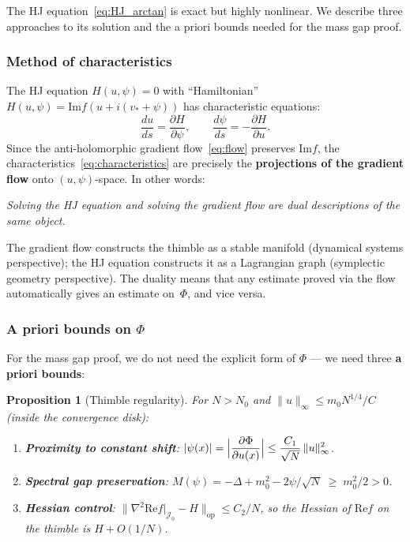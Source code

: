 \documentclass[12pt]{article}
\newtheorem{proposition}[theorem]{Proposition}
\theoremstyle{definition}
\theoremstyle{remark}
\newcommand{\im}{\mathrm{Im}}
\newcommand{\re}{\mathrm{Re}}
\begin{document}
The HJ equation~\eqref{eq:HJ_arctan} is exact but highly nonlinear.
We describe three approaches to its solution and the a priori
bounds needed for the mass gap proof.

\subsubsection{Method of characteristics}

The HJ equation $H(u,\psi) = 0$ with ``Hamiltonian''
$H(u,\psi) = \im f(u+i(v_*+\psi))$ has characteristic equations:
\begin{equation}\label{eq:characteristics}
  \frac{du}{ds} = \frac{\partial H}{\partial\psi}, \qquad
  \frac{d\psi}{ds} = -\frac{\partial H}{\partial u}.
\end{equation}
Since the anti-holomorphic gradient flow~\eqref{eq:flow} preserves
$\im f$, the characteristics~\eqref{eq:characteristics} are
precisely the \textbf{projections of the gradient flow} onto
$(u,\psi)$-space. In other words:

\begin{center}
\emph{Solving the HJ equation and solving the gradient flow are
dual descriptions of the same object.}
\end{center}

The gradient flow constructs the thimble as a stable manifold
(dynamical systems perspective); the HJ equation constructs it
as a Lagrangian graph (symplectic geometry perspective). The
duality means that any estimate proved via the flow automatically
gives an estimate on~$\Phi$, and vice versa.

\subsubsection{A priori bounds on $\Phi$}

For the mass gap proof, we do not need the explicit form of $\Phi$
--- we need three \textbf{a priori bounds}:

\begin{proposition}[Thimble regularity]\label{prop:apriori}
For $N > N_0$ and $\|u\|_\infty \le m_0 N^{1/4}/C$
(inside the convergence disk):
\begin{enumerate}
\item \textbf{Proximity to constant shift}:
  $\displaystyle |\psi(x)| = \Bigl|\frac{\partial\Phi}{\partial u(x)}\Bigr|
    \le \frac{C_1}{\sqrt{N}}\,\|u\|_\infty^2$.
\item \textbf{Spectral gap preservation}:
  $M(\psi) = -\Delta + m_0^2 - 2\psi/\sqrt{N} \;\ge\; m_0^2/2 > 0$.
\item \textbf{Hessian control}:
  $\|\nabla^2\re f|_{\mathcal{J}_0} - H\|_{\mathrm{op}} \le C_2/N$,
  so the Hessian of $\re f$ on the thimble is $H + O(1/N)$.
\end{enumerate}
\end{proposition}
\end{document}

